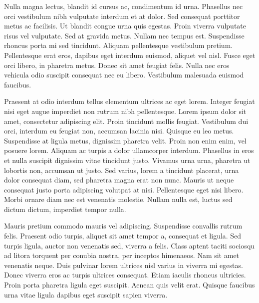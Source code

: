 Nulla magna lectus, blandit id cursus ac, condimentum id urna.
Phasellus nec orci vestibulum nibh vulputate interdum et at dolor.
Sed consequat porttitor metus ac facilisis.
Ut blandit congue urna quis egestas.
Proin viverra vulputate risus vel vulputate.
Sed at gravida metus.
Nullam nec tempus est.
Suspendisse rhoncus porta mi sed tincidunt.
Aliquam pellentesque vestibulum pretium.
Pellentesque erat eros, dapibus eget interdum euismod, aliquet vel nisl.
Fusce eget orci libero, in pharetra metus.
Donec sit amet feugiat felis.
Nulla nec eros vehicula odio suscipit consequat nec eu libero.
Vestibulum malesuada euismod faucibus.

Praesent at odio interdum tellus elementum ultrices ac eget lorem.
Integer feugiat nisi eget augue imperdiet non rutrum nibh pellentesque.
Lorem ipsum dolor sit amet, consectetur adipiscing elit.
Proin tincidunt mollis feugiat.
Vestibulum dui orci, interdum eu feugiat non, accumsan lacinia nisi.
Quisque eu leo metus.
Suspendisse at ligula metus, dignissim pharetra velit.
Proin non enim enim, vel posuere lorem.
Aliquam ac turpis a dolor ullamcorper interdum.
Phasellus in eros et nulla suscipit dignissim vitae tincidunt justo.
Vivamus urna urna, pharetra ut lobortis non, accumsan ut justo.
Sed varius, lorem a tincidunt placerat, urna dolor consequat diam, sed pharetra magna erat non nunc.
Mauris ut neque consequat justo porta adipiscing volutpat at nisi.
Pellentesque eget nisi libero.
Morbi ornare diam nec est venenatis molestie.
Nullam nulla est, luctus sed dictum dictum, imperdiet tempor nulla.

Mauris pretium commodo mauris vel adipiscing.
Suspendisse convallis rutrum felis.
Praesent odio turpis, aliquet sit amet tempor a, consequat et ligula.
Sed turpis ligula, auctor non venenatis sed, viverra a felis.
Class aptent taciti sociosqu ad litora torquent per conubia nostra, per inceptos himenaeos.
Nam sit amet venenatis neque.
Duis pulvinar lorem ultrices nisl varius in viverra mi egestas.
Donec viverra eros ac turpis ultrices consequat.
Etiam iaculis rhoncus ultricies.
Proin porta pharetra ligula eget suscipit.
Aenean quis velit erat.
Quisque faucibus urna vitae ligula dapibus eget suscipit sapien viverra.

